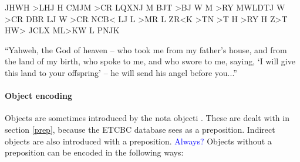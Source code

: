 \documentclass{report}
\newcommand{\cl}[2]{\begingroup\beginL\begingroup\color{#1}\beginR#2\endR\endgroup\endL\endgroup}
\newcommand{\hebr}[1]{\cjRL{#1}}
\begin{document}
\begin{itemize}
\begin{cjhebrew}
\cl{red}{JHWH >LHJ H CMJM >CR LQXNJ M BJT >BJ W M >RY MWLDTJ W >CR DBR LJ W >CR NCB< LJ L >MR L ZR<K >TN >T H >RY H Z>T} \\
HW> JCLX ML>KW L PNJK
\end{cjhebrew}

``Yahweh, the God of heaven -- who took me from my father’s house, and from the land of my birth, who spoke to me, and who swore to me, saying, `I will give this land to your offspring' -- he will send his angel before you...''
\end{itemize}

\paragraph{Object encoding}
Objects are sometimes introduced by the nota objecti \hebr{>T}. These are dealt with in section \ref{prep}, because the ETCBC database sees \hebr{>T} as a preposition. Indirect objects are also introduced with a preposition. \textcolor{blue}{Always?} Objects without a preposition can be encoded in the following ways:
\end{document}
